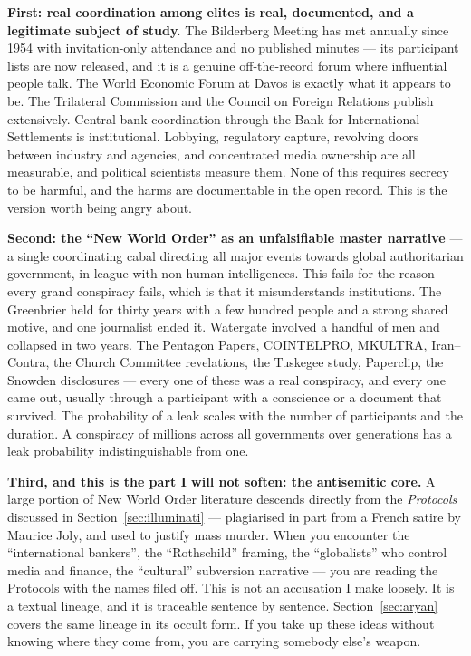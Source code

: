 \textbf{First: real coordination among elites is real, documented, and a legitimate subject of
study.} The Bilderberg Meeting has met annually since 1954 with invitation-only attendance and no
published minutes --- its participant lists are now released, and it is a genuine off-the-record
forum where influential people talk. The World Economic Forum at Davos is exactly what it appears
to be. The Trilateral Commission and the Council on Foreign Relations publish extensively. Central
bank coordination through the Bank for International Settlements is institutional. Lobbying,
regulatory capture, revolving doors between industry and agencies, and concentrated media ownership
are all measurable, and political scientists measure them. None of this requires secrecy to be
harmful, and the harms are documentable in the open record. This is the version worth being angry
about.

\textbf{Second: the ``New World Order'' as an unfalsifiable master narrative} --- a single
coordinating cabal directing all major events towards global authoritarian government, in league with
non-human intelligences. This fails for the reason every grand conspiracy fails, which is that it
misunderstands institutions.  The
Greenbrier held for thirty years with a few hundred people and a strong shared motive, and one
journalist ended it. Watergate involved a handful of men and collapsed in two years. The Pentagon
Papers, COINTELPRO, MKULTRA, Iran--Contra, the Church Committee revelations, the Tuskegee study,
Paperclip, the Snowden disclosures --- every one of these was a real conspiracy, and every one
came out, usually through a participant with a conscience or a document that survived. The
probability of a leak scales with the number of participants and the duration. A conspiracy of
millions across all governments over generations has a leak probability indistinguishable from one.

\textbf{Third, and this is the part I will not soften: the antisemitic core.} A large portion of
New World Order literature descends directly from the \emph{Protocols} discussed in
Section~\ref{sec:illuminati} --- plagiarised in part from a French satire by Maurice Joly, and used
to justify mass murder. When you encounter the ``international bankers'', the ``Rothschild'' framing, the
``globalists'' who control media and finance, the ``cultural'' subversion narrative --- you are
reading the Protocols with the names filed off. This is not an accusation I make loosely. It is a
textual lineage, and it is traceable sentence by sentence. Section~\ref{sec:aryan} covers the same lineage in
its occult form. If you take up these ideas without knowing where they come from, you are carrying
somebody else's weapon.

